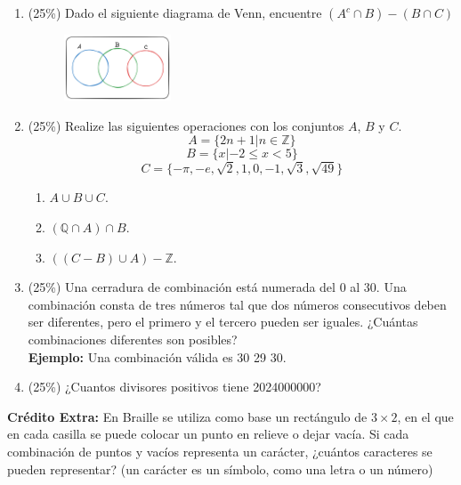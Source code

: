 \begin{enumerate}
    \item (25\%) Dado el siguiente diagrama de Venn, encuentre $(A^c\cap B)-(B\cap C)$
    \begin{figure}[h]
        \centering
        \includegraphics[width=0.3\textwidth]{../Imagenes/IMG1/venn.png}
        \caption{}
        \label{fig:enter-label}
    \end{figure}
    \item (25\%) Realize las siguientes operaciones con los conjuntos $A$, $B$ y $C$.\[A=\{2n + 1 | n \in \mathbb{Z}\}\]\[B=\{x | -2 \leq x < 5\}\]\[C=\{-\pi, -e, \sqrt{2}, 1, 0, -1, \sqrt{3}, \sqrt{49}\}\]
    \begin{multicols}{2}
        \begin{enumerate}
        \item $A\cup B \cup C$.
        \item $(\mathbb{Q}\cap A)\cap B$.
        \item $((C-B)\cup A)-\mathbb{Z}$.
    \end{enumerate}
    \end{multicols}
    \item (25\%) Una cerradura de combinación está numerada del 0 al 30. Una combinación consta de tres números tal que dos números consecutivos deben ser diferentes, pero el primero y el tercero pueden ser iguales. ¿Cuántas combinaciones diferentes son posibles?\\
    \textbf{Ejemplo:} Una combinación válida es 30 29 30.
    \item (25\%) ¿Cuantos divisores positivos tiene 2024000000?
\end{enumerate}

\textbf{Crédito Extra:} En Braille se utiliza como base un rectángulo de $3\times2$, en el que en cada casilla se puede colocar un punto en relieve o dejar vacía. Si cada combinación de puntos y vacíos representa un carácter, ¿cuántos caracteres se pueden representar? (un carácter es un símbolo, como una letra o un número)


